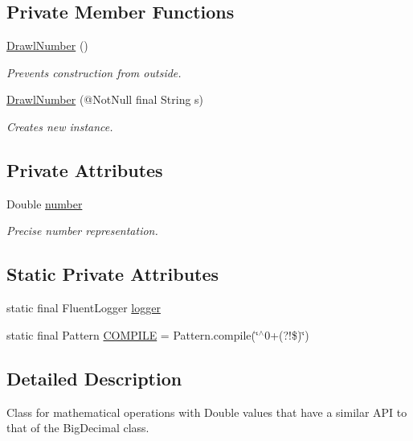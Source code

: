 \subsection*{Private Member Functions}
\begin{DoxyCompactItemize}
\item 
\hyperlink{classcom_1_1aarrelaakso_1_1drawl_1_1_drawl_number_ae870bc04b03801d06c155d5f89e1319e}{Drawl\+Number} ()
\begin{DoxyCompactList}\small\item\em Prevents construction from outside. \end{DoxyCompactList}\item 
\hyperlink{classcom_1_1aarrelaakso_1_1drawl_1_1_drawl_number_a317a243130f58ce5c2d5e4156526316d}{Drawl\+Number} (@Not\+Null final String s)
\begin{DoxyCompactList}\small\item\em Creates new instance. \end{DoxyCompactList}\end{DoxyCompactItemize}
\subsection*{Private Attributes}
\begin{DoxyCompactItemize}
\item 
Double \hyperlink{classcom_1_1aarrelaakso_1_1drawl_1_1_drawl_number_a9fe9f40163a4f5581b35d61ecf63f278}{number}
\begin{DoxyCompactList}\small\item\em Precise number representation. \end{DoxyCompactList}\end{DoxyCompactItemize}
\subsection*{Static Private Attributes}
\begin{DoxyCompactItemize}
\item 
static final Fluent\+Logger \hyperlink{classcom_1_1aarrelaakso_1_1drawl_1_1_drawl_number_ad2eb8e8b4021e0d474b39f06e81ff9e7}{logger}
\item 
static final Pattern \hyperlink{classcom_1_1aarrelaakso_1_1drawl_1_1_drawl_number_a1264dfbcaff0b610a0b6a5e5a6b37e72}{C\+O\+M\+P\+I\+LE} = Pattern.\+compile(\char`\"{}$^\wedge$0+(?!\$)\char`\"{})
\end{DoxyCompactItemize}


\subsection{Detailed Description}
Class for mathematical operations with Double values that have a similar A\+PI to that of the Big\+Decimal class. 

